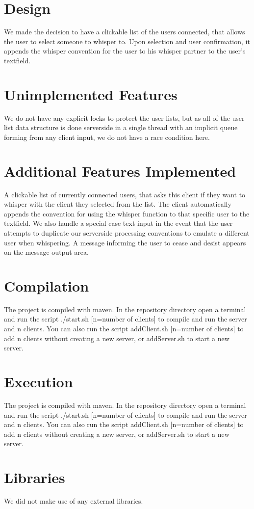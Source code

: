 \documentclass[12pt, a4paper]{article}
\begin{document}
\section{Design}
We made the decision to have a clickable list of the users connected, that allows the user to select someone to whisper to. Upon selection and user confirmation, it appends the whisper convention for the user to his whisper partner to the user's textfield.

\section{Unimplemented Features}
We do not have any explicit locks to protect the user lists, but as all of the user list data structure is done serverside in a single thread with an implicit queue forming from any client input, we do not have a race condition here.

\section{Additional Features Implemented}
A clickable list of currently connected users, that asks this client if they want to whisper with the client they selected from the list. The client automatically appends the convention for using the whisper function to that specific user to the textfield.
We also handle a special case text input in the event that the user attempts to duplicate our serverside processing conventions to emulate a different user when whispering. A message informing the user to cease and desist appears on the message output area.

\section{Compilation}
The project is compiled with maven. In the repository directory open a terminal and run the script ./start.sh [n=number of clients] to compile and run the server and n clients. You can also run the script addClient.sh [n=number of clients] to add n clients without creating a new server, or addServer.sh to start a new server.

\section{Execution}
The project is compiled with maven. In the repository directory open a terminal and run the script ./start.sh [n=number of clients] to compile and run the server and n clients. You can also run the script addClient.sh [n=number of clients] to add n clients without creating a new server, or addServer.sh to start a new server.

\section{Libraries}
We did not make use of any external libraries.
\end{document}
